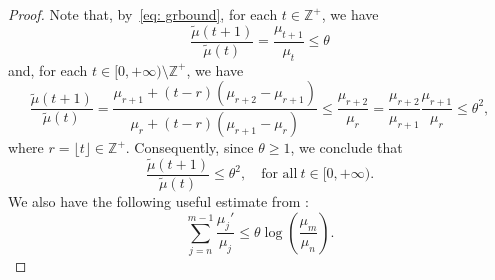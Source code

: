 \documentclass[reqno, a4paper, 10pt]{amsart}
\theoremstyle{plain}
\numberwithin{equation}{section}
\theoremstyle{remark}
\def\Z{\mathbb{Z}}
\begin{document}
\begin{proof}
Note that, by~\eqref{eq: grbound}, for each $t \in \Z^+$, we have
\[
\frac{\tilde{\mu}(t+1)}{\tilde{\mu}(t)}=\frac{\mu_{t+1}}{\mu_t}\le \theta
\]
and, for each $t \in [0,+\infty)\setminus\Z^+$, we have
\[
\frac{\tilde{\mu}(t+1)}{\tilde{\mu}(t)}=\frac{\mu_{r+1}+(t-r)(\mu_{r+2}-\mu_{r+1})}{\mu_r+(t-r)(\mu_{r+1}-\mu_r)}\le \frac{\mu_{r+2}}{\mu_r}=\frac{\mu_{r+2}}{\mu_{r+1}}\frac{\mu_{r+1}}{\mu_r} \le \theta^2,
\]
where $r=\lfloor t\rfloor \in \Z^+$. Consequently, since $\theta \ge 1$, we conclude that
\begin{equation}\label{eq:bound2}
\frac{\tilde{\mu}(t+1)}{\tilde{\mu}(t)}\le \theta^2, \quad \text{for all} \ t \in [0,+\infty).
\end{equation}
We also have the following useful estimate from \cite[Lemma 3.1]{DSV}: \begin{equation}\label{nm-1}
\sum_{j=n}^{m-1}\frac{\mu_j'}{\mu_j}\le \theta \log \left (\frac{\mu_m}{\mu_n}\right ).
\end{equation}


\end{proof}
\end{document}
